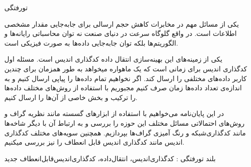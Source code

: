 


\begin{وسط‌چین}
\end{وسط‌چین}
‌تورفتگی

یکی از مسائل مهم در مخابرات کاهش حجم ارسالی برای جابه‌جایی مقدار مشخصی اطلاعات است. در واقع گلوگاه سرعت در دنیای صنعت نه توان محاسباتی رایانه‌ها و الگوریتم‌ها بلکه توان جابه‌جایی داده‌ها به صورت فیزیکی است.

یکی از زمینه‌های این بهینه‌سازی انتقال داده کدگذاری اندیس است. مسئله اول کدگذاری اندیس برای زمانی است که یک ماهواره میخواهد به طور همزمان برای چندین کاربر داده‌های مختلفی را ارسال کند. اگر نخواهیم تمام داده‌ها را پیاپی ارسال کنیم و به اندازه‌ی تعداد داده‌ها زمان صرف کنیم مجبوریم با استفاده از روش‌های مختلف داده‌ها را ترکیب و بخش خاصی از آن‌ها را ارسال کنیم.

در این پایان‌‌نامه می‌خواهیم با استفاده از ابزارهای گسسته مانند نظریه گراف و روش‌های احتمالاتی مسائل مختلف این حوزه را بررسی و به ارتباط آن با دیگر شاخه‌ها مانند کدگذار‌ی‌شبکه و رنگ آمیزی گراف‌ها بپردازیم. همچنین سویه‌های مختلف کدگذاری اندیس مانند کدگذاری اندیس قابل انعطاف را نیز بررسی میکنیم.
\lrfootnote{\XeTeX}

‌بلند
‌تورفتگی :
کدگذاری‌اندیس، انتقال‌داده، کدگذاری‌اندیس‌قابل‌انعطاف
‌جدید
